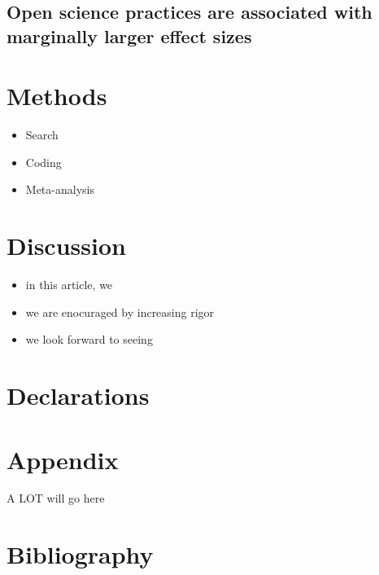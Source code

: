 \documentclass[sn-nature,pdflatex]{sn-jnl}
\providecommand{\tightlist}{%
  \setlength{\itemsep}{0pt}\setlength{\parskip}{0pt}}
\begin{document}
\subsection{Open science practices are associated with marginally larger
effect
sizes}\label{open-science-practices-are-associated-with-marginally-larger-effect-sizes}

\section{Methods}\label{sec3}

\begin{itemize}
\tightlist
\item
  Search
\item
  Coding
\item
  Meta-analysis
\end{itemize}

\section{Discussion}\label{sec4}

\begin{itemize}
\tightlist
\item
  in this article, we
\item
  we are enocuraged by increasing rigor
\item
  we look forward to seeing
\end{itemize}

\backmatter



\section*{Declarations}\label{declarations}

\section{Appendix}\label{secA1}

A LOT will go here

\section{Bibliography}\label{bibliography}

\renewcommand\refname{References}

\end{document}
